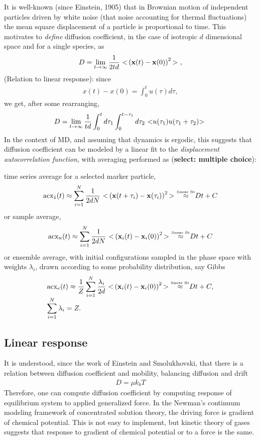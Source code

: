 \documentclass[a4paper, 11 pt]{article}
\theoremstyle{definition}
\theoremstyle{remark}
\newcommand{\dst} {\displaystyle}
\newcommand{\la} {\lambda}
\newcommand{\lt} {\ {\bf <}}
\newcommand{\rt} {{\bf >}\ }
\newcommand{\lb} {\left(}
\newcommand{\rb} {\right)}
\newcommand{\bgea}{\begin{equation} \begin{array}{l} }
\newcommand{\enea}{ \end{array} \end{equation}}
\newcommand{\ax}{\mbox{acx}}
\begin{document}
It is well-known (since Einstein, 1905) that in Brownian motion of independent particles driven by white noise (that noise accounting for thermal fluctuations) the mean square displacement of a particle is proportional to time. This motivates to {\it define} diffusion coefficient, in the case of isotropic $d$ dimensional space   and for a single species, as
\bgea
\dst D =  \lim_{t\rightarrow \infty} \frac{1}{2 t d} \lt \lb \mathbf{x}(t) - \mathbf{x}(0) \rb^2 \rt,
\enea
(Relation to linear response): since
\bgea
x(t) - x(0) = \dst\int_0^t u (\tau) d \tau ,
\enea
we get, after some rearranging,
\bgea
D = \dst  \lim_{t\rightarrow \infty} \frac{1}{t d} \int_0^t d \tau_1 \int_0^{t-\tau_1}d\tau_2 \lt u(\tau_1) u (\tau_1 + \tau_2) \rt
\enea
In the context of MD, and assuming that dynamics is ergodic, this suggests that diffusion coefficient can be modeled by a linear fit to the {\it displacement autocorrelation function}, with averaging performed as ({\bf select: multiple choice}):

\noindent time series average for a selected marker particle,
\bgea
\ax_1(t) \approx \dst \sum_{i=1}^{N} \frac{1}{2   d N} \lt \lb \mathbf{x}(t+ \tau_i) - \mathbf{x}(\tau_i) \rb^2 \rt   {\stackrel{\mbox{\tiny linear fit}}{\approx}}  D t + C
\enea
or sample average,
\bgea
\ax_{\mbox{\tiny N}}(t) \approx \dst \sum_{i=1}^{N} \frac{1}{2 d N} \lt \lb \mathbf{x}_i(t) - \mathbf{x}_i(0) \rb^2 \rt   {\stackrel{\mbox{\tiny linear fit}}{\approx}}  D t + C
\enea
or ensemble  average, with initial configurations sampled in the phase space with weights $\la_i$, drawn according to some probability distribution, say Gibbs
\bgea
\ax_e(t) \approx \dst \frac{1}{Z} \sum_{i=1}^{N}  \frac{\la_i}{2 d}  \lt \lb \mathbf{x}_i(t) - \mathbf{x}_i(0) \rb^2 \rt   {\stackrel{\mbox{\tiny linear fit}}{\approx}}  D t + C ,
 \\
 \dst \sum_{i=1}^{N} \la_i =Z.
\enea

\subsection{Linear response}
It is understood, since the work of Einstein and Smolukhovski, that there is a relation between diffusion coefficient and mobility, balancing diffusion and drift
\bgea
D = \mu k_b  T
\enea
Therefore, one can compute diffusion coefficient by computing response of equilibrium system to applied generalized force. In the Newman's continuum modeling framework of concentrated solution theory, the driving force is gradient of chemical potential. This is not easy to implement, but kinetic theory of gases suggests that response to gradient of chemical potential or to a force is the same. 
\end{document}
